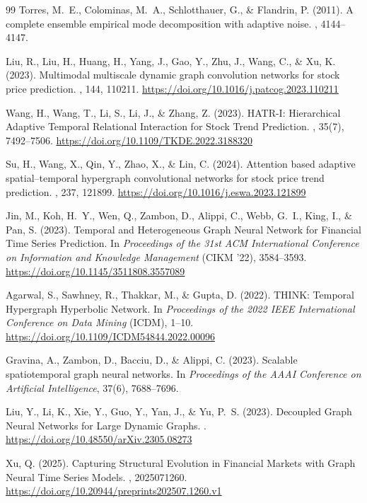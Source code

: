 \documentclass[11pt,a4paper]{article}
\begin{document}
\begin{thebibliography}{99}
Torres, M.~E., Colominas, M.~A., Schlotthauer, G., \& Flandrin, P. (2011).
\newblock A complete ensemble empirical mode decomposition with adaptive noise.
, 4144--4147.

Liu, R., Liu, H., Huang, H., Yang, J., Gao, Y., Zhu, J., Wang, C., \& Xu, K. (2023).
\newblock Multimodal multiscale dynamic graph convolution networks for stock price prediction.
, 144, 110211.
\newblock \url{https://doi.org/10.1016/j.patcog.2023.110211}

Wang, H., Wang, T., Li, S., Li, J., \& Zhang, Z. (2023).
\newblock HATR-I: Hierarchical Adaptive Temporal Relational Interaction for Stock Trend Prediction.
, 35(7), 7492--7506.
\newblock \url{https://doi.org/10.1109/TKDE.2022.3188320}

Su, H., Wang, X., Qin, Y., Zhao, X., \& Lin, C. (2024).
\newblock Attention based adaptive spatial--temporal hypergraph convolutional networks for stock price trend prediction.
, 237, 121899.
\newblock \url{https://doi.org/10.1016/j.eswa.2023.121899}

Jin, M., Koh, H.~Y., Wen, Q., Zambon, D., Alippi, C., Webb, G.~I., King, I., \& Pan, S. (2023).
\newblock Temporal and Heterogeneous Graph Neural Network for Financial Time Series Prediction.
\newblock In {\em Proceedings of the 31st ACM International Conference on Information and Knowledge Management} (CIKM '22), 3584--3593.
\newblock \url{https://doi.org/10.1145/3511808.3557089}

Agarwal, S., Sawhney, R., Thakkar, M., \& Gupta, D. (2022).
\newblock THINK: Temporal Hypergraph Hyperbolic Network.
\newblock In {\em Proceedings of the 2022 IEEE International Conference on Data Mining} (ICDM), 1--10.
\newblock \url{https://doi.org/10.1109/ICDM54844.2022.00096}

Gravina, A., Zambon, D., Bacciu, D., \& Alippi, C. (2023).
\newblock Scalable spatiotemporal graph neural networks.
\newblock In {\em Proceedings of the AAAI Conference on Artificial Intelligence}, 37(6), 7688--7696.

Liu, Y., Li, K., Xie, Y., Guo, Y., Yan, J., \& Yu, P.~S. (2023).
\newblock Decoupled Graph Neural Networks for Large Dynamic Graphs.
.
\newblock \url{https://doi.org/10.48550/arXiv.2305.08273}

Xu, Q. (2025).
\newblock Capturing Structural Evolution in Financial Markets with Graph Neural Time Series Models.
, 2025071260.
\newblock \url{https://doi.org/10.20944/preprints202507.1260.v1}

\end{thebibliography}
\end{document}
